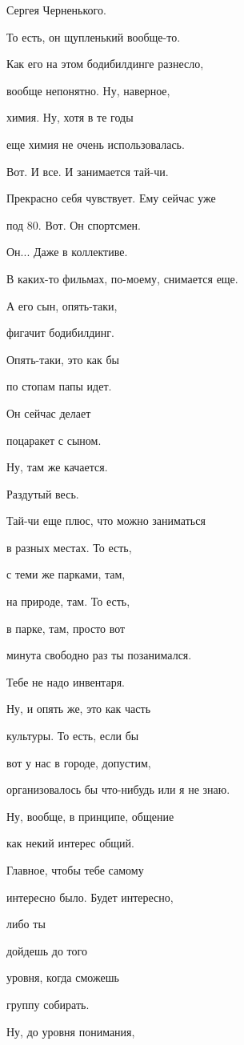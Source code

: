 Сергея Черненького.

То есть, он щупленький вообще-то.

Как его на этом бодибилдинге разнесло,

вообще непонятно. Ну, наверное,

химия. Ну, хотя в те годы

еще химия не очень использовалась.

Вот. И все. И занимается тай-чи.

Прекрасно себя чувствует. Ему сейчас уже

под 80. Вот. Он спортсмен.

Он... Даже в коллективе.

В каких-то фильмах, по-моему, снимается еще.

А его сын, опять-таки,

фигачит бодибилдинг.

Опять-таки, это как бы

по стопам папы идет.

Он сейчас делает

поцаракет с сыном.

Ну, там же качается.

Раздутый весь.

Тай-чи еще плюс, что можно заниматься

в разных местах. То есть,

с теми же парками, там,

на природе, там. То есть,

в парке, там, просто вот

минута свободно раз ты позанимался.

Тебе не надо инвентаря.

Ну, и опять же, это как часть

культуры. То есть, если бы

вот у нас в городе, допустим,

организовалось бы что-нибудь или я не знаю.

Ну, вообще, в принципе, общение

как некий интерес общий.

Главное, чтобы тебе самому

интересно было. Будет интересно,

либо ты

дойдешь до того

уровня, когда сможешь

группу собирать.

Ну, до уровня понимания,

